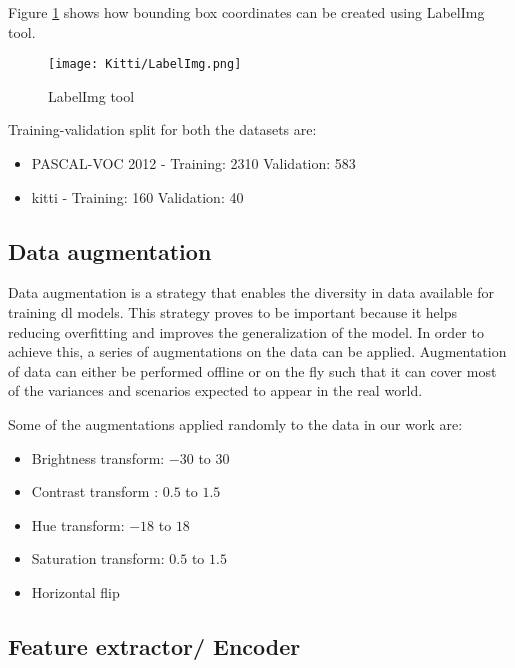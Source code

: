 \par

Figure \ref{LabelImg} shows how bounding box coordinates can be created using LabelImg tool. 

\begin{figure}[h!]
    \centering
    \texttt{[image: Kitti/LabelImg.png]}
    \caption{LabelImg tool}
    \label{LabelImg}
\end{figure}


Training-validation split for both the datasets are: 

\begin{itemize}
    \item PASCAL-VOC 2012 - Training: 2310 Validation: 583 
    \item \ac{kitti}  - Training: 160 Validation: 40
\end{itemize}

\subsection{Data augmentation} \label{augmentations}

Data augmentation is a strategy that enables the diversity in data available for training \ac{dl} models. This strategy proves to be important because it helps reducing overfitting and improves the generalization of the model. In order to achieve this, a series of augmentations on the data can be applied. Augmentation of data can either be performed offline or on the fly such that it can cover most of the variances and scenarios expected to appear in the real world. 
\par
Some of the augmentations applied randomly to the data in our work are:
\begin{itemize}
    \item Brightness transform: $-30$ to $30$
    \item Contrast transform : $0.5$ to $1.5$
    \item Hue transform: $-18$ to $18$
    \item Saturation transform: $0.5$ to $1.5$
    \item Horizontal flip
\end{itemize}


\subsection{Feature extractor/ Encoder} \label{Encoder}

